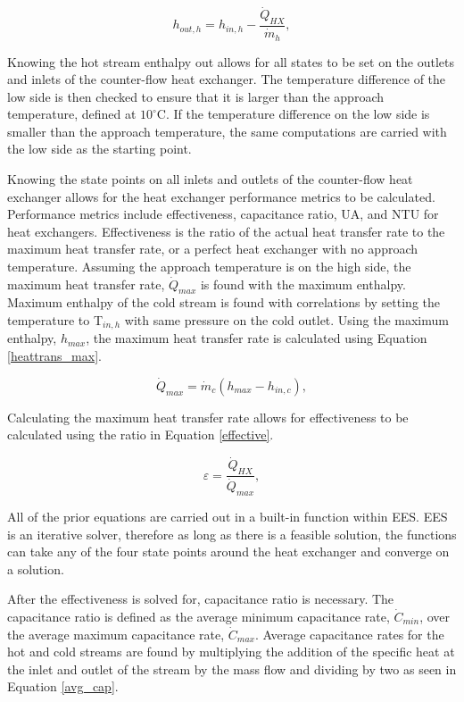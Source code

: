 \begin{paracol}{2}
 \begin{equation}
    \label{enthalpy_h}
     h_{out,h} = h_{in,h} - \frac{\dot{Q}_{HX}}{\dot{m}_{h}},
 \end{equation}

Knowing the hot stream enthalpy out allows for all states to be set on the outlets and inlets of the counter-flow heat exchanger. The temperature difference of the low side is then checked to ensure that it is larger than the approach temperature, defined at $10^\circ$C. If the temperature difference on the low side is smaller than the approach temperature, the same computations are carried with the low side as the starting point.

Knowing the state points on all inlets and outlets of the counter-flow heat exchanger allows for the heat exchanger performance metrics to be calculated. Performance metrics include effectiveness, capacitance ratio, UA, and NTU for heat exchangers. Effectiveness is the ratio of the actual heat transfer rate to the maximum heat transfer rate, or a perfect heat exchanger with no approach temperature. Assuming the approach temperature is on the high side, the maximum heat transfer rate, $\dot{Q}_{max}$ is found with the maximum enthalpy. Maximum enthalpy of the cold stream is found with correlations by setting the temperature to T$_{in,h}$ with same pressure on the cold outlet. Using the maximum enthalpy, $h_{max}$, the maximum heat transfer rate is calculated using Equation \ref{heattrans_max}.

\begin{equation}
    \label{heattrans_max}
    \dot{Q}_{max} = \dot{m}_{c}(h_{max}-h_{in,c}),
\end{equation}

Calculating the maximum heat transfer rate allows for effectiveness to be calculated using the ratio in Equation \ref{effective}.

\begin{equation}
    \label{effective}
    \varepsilon = \frac{\dot{Q}_{HX}}{\dot{Q}_{max}},
\end{equation}

All of the prior equations are carried out in a built-in function within EES. EES is an iterative solver, therefore as long as there is a feasible solution, the functions can take any of the four state points around the heat exchanger and converge on a solution.

After the effectiveness is solved for, capacitance ratio is necessary. The capacitance ratio is defined as the average minimum capacitance rate, $\dot{C}_{min}$, over the average maximum capacitance rate, $\dot{C}_{max}$. Average capacitance rates for the hot and cold streams are found by multiplying the addition of the specific heat at the inlet and outlet of the stream by the mass flow and dividing by two as seen in Equation \ref{avg_cap}.


\end{paracol}
